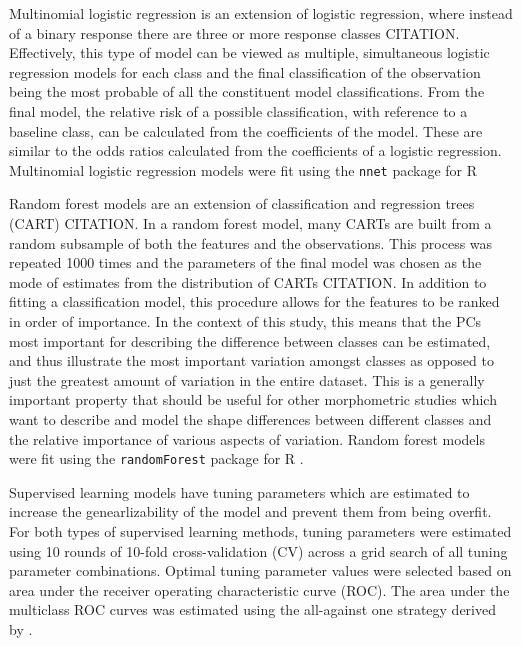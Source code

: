 \documentclass[12pt,letterpaper]{article}\usepackage{graphicx, color}
\begin{document}
Multinomial logistic regression is an extension of logistic regression, where instead of a binary response there are three or more response classes CITATION. Effectively, this type of model can be viewed as multiple, simultaneous logistic regression models for each class and the final classification of the observation being the most probable of all the constituent model classifications. From the final model, the relative risk of a possible classification, with reference to a baseline class, can be calculated from the coefficients of the model. These are similar to the odds ratios calculated from the coefficients of a logistic regression. Multinomial logistic regression models were fit using the \texttt{nnet} package for R \citep{Venables2002}

Random forest models are an extension of classification and regression trees (CART) CITATION. In a random forest model, many CARTs are built from a random subsample of both the features and the observations. This process was repeated 1000 times and the parameters of the final model was chosen as the mode of estimates from the distribution of CARTs CITATION. In addition to fitting a classification model, this procedure allows for the features to be ranked in order of importance. In the context of this study, this means that the PCs most important for describing the difference between classes can be estimated, and thus illustrate the most important variation amongst classes as opposed to just the greatest amount of variation in the entire dataset. This is a generally important property that should be useful for other morphometric studies which want to describe and model the shape differences between different classes and the relative importance of various aspects of variation. Random forest models were fit using the \texttt{randomForest} package for R \citep{Liaw2002}.


Supervised learning models have tuning parameters which are estimated to increase the genearlizability of the model and prevent them from being overfit. For both types of supervised learning methods, tuning parameters were estimated using 10 rounds of 10-fold cross-validation (CV) across a grid search of all tuning parameter combinations. Optimal tuning parameter values were selected based on area under the receiver operating characteristic curve (ROC). The area under the multiclass ROC curves was estimated using the all-against one strategy derived by \citet{Hand2001}.
\end{document}
